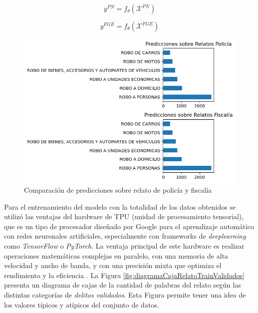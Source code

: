 \documentclass[onecolumn, journal, english, 12pt, a4paper]{IEEEtran} %
\theoremstyle{definition}
\begin{document}
\begin{equation}\label{eq:prediccionRelatoPolicia}
    y^{PN} = f_\theta(\mathbf{\mathcal{X}}^{PN})
\end{equation}

\begin{equation}\label{eq:prediccionRelatoFGE}
    y^{FGE} = f_\theta(\mathbf{\mathcal{X}}^{FGE})
\end{equation}

\begin{figure}[h!]
    \centering
    \includegraphics[width=\textwidth]{imgs/prediccionDelitosSeguimientoPoliciaVsFiscalia.png}
    \caption{Comparación de predicciones sobre relato de policía y fiscalía}
    \label{fig:comparacionDelitosSeguimientoRelatos}
\end{figure}

Para el entrenamiento del modelo con la totalidad de los datos
obtenidos se utilizó las ventajas del hardware de TPU (unidad de
procesamiento tensorial), que es un tipo de procesador diseñado por
Google para el aprendizaje automático con redes neuronales
artificiales, especialmente con frameworks de \emph{deeplearning} como
\emph{TensorFlow} o \emph{PyTorch}. La ventaja principal de este
hardware es realizar operaciones matemáticas complejas en paralelo,
con una memoria de alta velocidad y ancho de banda, y con una
precisión mixta que optimiza el rendimiento y la eficiencia
\parencite{torx2023, wikipedia_tpu}. La Figura
\ref{fig:diagramaCajaRelatoTrainValidados} presenta un diagrama de
cajas de la cantidad de palabras del relato según las distintas
categorías de \emph{delitos validados}. Esta Figura permite tener una
idea de los valores típicos y atípicos del conjunto de datos.
\end{document}
